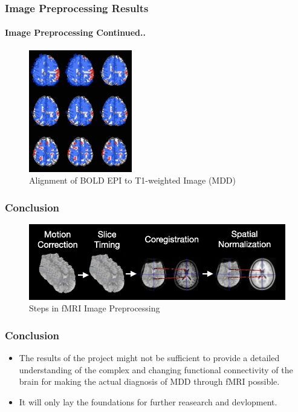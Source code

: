 \documentclass{beamer}
\begin{document}
  \begin{frame}[shrink=6,t]
    \frametitle{Image Preprocessing Results}
    \framesubtitle{Image Preprocessing Continued..}

      \begin{center}
    \begin{figure}[H]
      \includegraphics[width=0.4\textwidth]{./.img/0259-MDD.jpg}
      \caption{Alignment of BOLD EPI to T1-weighted Image (MDD)}
    \end{figure}
      \end{center}

  \end{frame}


  \begin{frame}[t]
    \frametitle{Conclusion}

    \vskip 20pt

    \begin{figure}[H]
      \centering
      \includegraphics[width=0.8\linewidth]{./.img/conclusion-preprocessing.png}
      \caption{Steps in fMRI Image Preprocessing}%
      \label{fig:name}
    \end{figure}
  \end{frame}
  \begin{frame}[t]
    \frametitle{Conclusion}

    \vskip 20pt

    \begin{itemize}

      \item The results of the project might not be sufficient to
        provide a detailed understanding of the complex and changing
        functional connectivity of the brain for making the actual
        diagnosis of MDD through fMRI possible.

      \item It will only lay the foundations for further reasearch and
        devlopment.
    \end{itemize}

  \end{frame}
\end{document}
